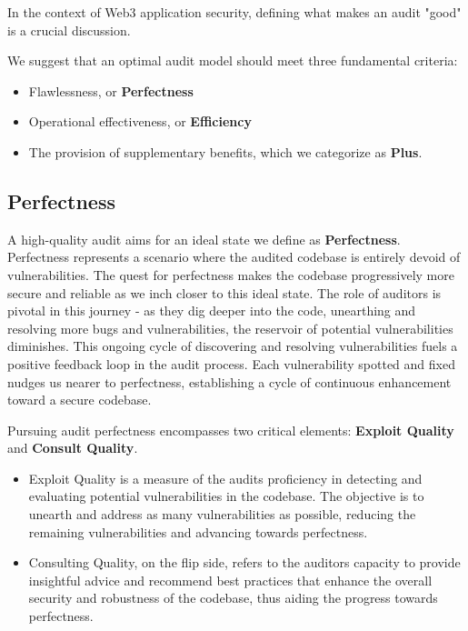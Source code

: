 \documentclass[10pt]{extarticle}
\def\tightlist{}
\begin{document}
In the context of Web3 application security, defining what makes an
audit "good" is a crucial discussion.

We suggest that an optimal audit model should meet three fundamental
criteria:

\begin{itemize}
\tightlist
\item
  Flawlessness, or \textbf{Perfectness}
\item
  Operational effectiveness, or \textbf{Efficiency}
\item
  The provision of supplementary benefits, which we categorize as
  \textbf{Plus}.
\end{itemize}

\subsection{Perfectness}\label{21-perfectness}

A high-quality audit aims for an ideal state we define as
\textbf{Perfectness}. Perfectness represents a scenario where the
audited codebase is entirely devoid of vulnerabilities. The quest for
perfectness makes the codebase progressively more secure and reliable as
we inch closer to this ideal state. The role of auditors is pivotal in
this journey - as they dig deeper into the code, unearthing and
resolving more bugs and vulnerabilities, the reservoir of potential
vulnerabilities diminishes. This ongoing cycle of discovering and
resolving vulnerabilities fuels a positive feedback loop in the audit
process. Each vulnerability spotted and fixed nudges us nearer to
perfectness, establishing a cycle of continuous enhancement toward a
secure codebase.

Pursuing audit perfectness encompasses two critical elements:
\textbf{Exploit Quality} and \textbf{Consult Quality}.

\begin{itemize}
\item
  Exploit Quality is a measure of the audit\textquotesingle s
  proficiency in detecting and evaluating potential vulnerabilities in
  the codebase. The objective is to unearth and address as many
  vulnerabilities as possible, reducing the remaining vulnerabilities
  and advancing towards perfectness.
\item
  Consulting Quality, on the flip side, refers to the
  auditor\textquotesingle s capacity to provide insightful advice and
  recommend best practices that enhance the overall security and
  robustness of the codebase, thus aiding the progress towards
  perfectness.
\end{itemize}
\end{document}
